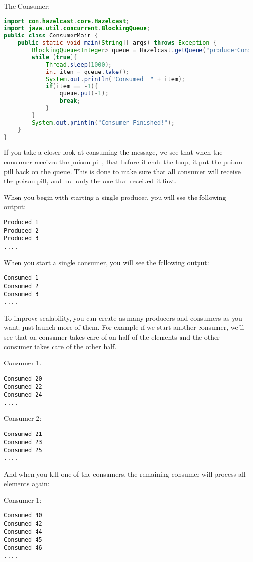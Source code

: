 The Consumer:
\begin{lstlisting}[language=java]
import com.hazelcast.core.Hazelcast;
import java.util.concurrent.BlockingQueue;
public class ConsumerMain {
    public static void main(String[] args) throws Exception {
        BlockingQueue<Integer> queue = Hazelcast.getQueue("producerConsumerQueue");
        while (true){
            Thread.sleep(1000);  
            int item = queue.take();
            System.out.println("Consumed: " + item);
            if(item == -1){
                queue.put(-1);
                break;
            }           
        }
        System.out.println("Consumer Finished!");
    }
}
\end{lstlisting}
If you take a closer look at consuming the message, we see that when the consumer receives the poison pill,
that before it ends the loop, it put the poison pill back on the queue. This is done to make sure that all
consumer will receive the poison pill, and not only the one that received it first.

When you begin with starting a single producer, you will see the following output:
\begin{verbatim}
Produced 1
Produced 2
Produced 3
....
\end{verbatim}

When you start a single consumer, you will see the following output:
\begin{verbatim}
Consumed 1
Consumed 2
Consumed 3
....
\end{verbatim}

To improve scalability, you can create as many producers and consumers as you want; just launch 
more of them. For example if we start another consumer, we'll see that on consumer takes care of
on half of the elements and the other consumer takes care of the other half.

Consumer 1:
\begin{verbatim}
Consumed 20
Consumed 22
Consumed 24
....
\end{verbatim}

Consumer 2:
\begin{verbatim}
Consumed 21
Consumed 23
Consumed 25
....
\end{verbatim}

And when you kill one of the consumers, the remaining consumer will process all elements again:

Consumer 1:
\begin{verbatim}
Consumed 40  
Consumed 42 
Consumed 44 
Consumed 45
Consumed 46
....
\end{verbatim}

